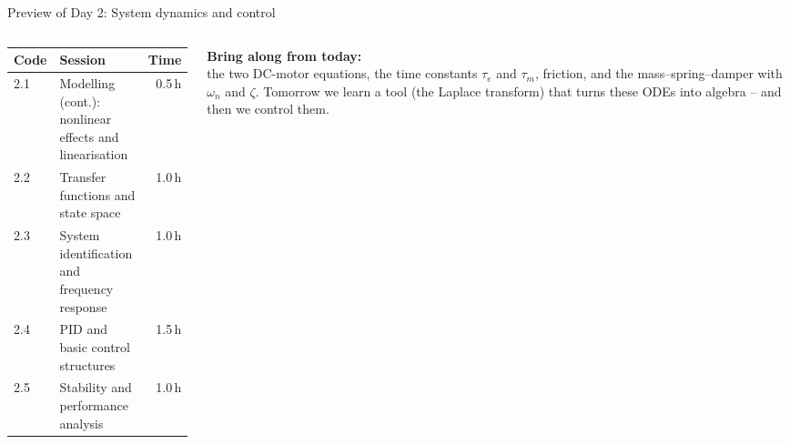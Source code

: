 \documentclass[aspectratio=169,10pt]{beamer}
\begin{document}
\begin{frame}{Preview of Day 2: System dynamics and control}
\begin{columns}[T]
\begin{column}{.55\textwidth}
\small
\renewcommand{\arraystretch}{1.15}
\begin{tabular}{@{}lp{5.2cm}r@{}}
\toprule
\textbf{Code} & \textbf{Session} & \textbf{Time}\\
\midrule
2.1 & Modelling (cont.): nonlinear effects and linearisation & 0.5\,h\\
2.2 & Transfer functions and state space & 1.0\,h\\
2.3 & System identification and frequency response & 1.0\,h\\
2.4 & PID and basic control structures & 1.5\,h\\
2.5 & Stability and performance analysis & 1.0\,h\\
\bottomrule
\end{tabular}
\end{column}
\begin{column}{.42\textwidth}
\begin{notebox}
\textbf{Bring along from today:}\\
the two DC-motor equations, the time constants $\tau_e$ and $\tau_m$, friction, and the mass--spring--damper with $\omega_n$ and $\zeta$. Tomorrow we learn a tool (the Laplace transform) that turns these ODEs into algebra -- and then we control them.
\end{notebox}
\end{column}
\end{columns}
\end{frame}
\end{document}
